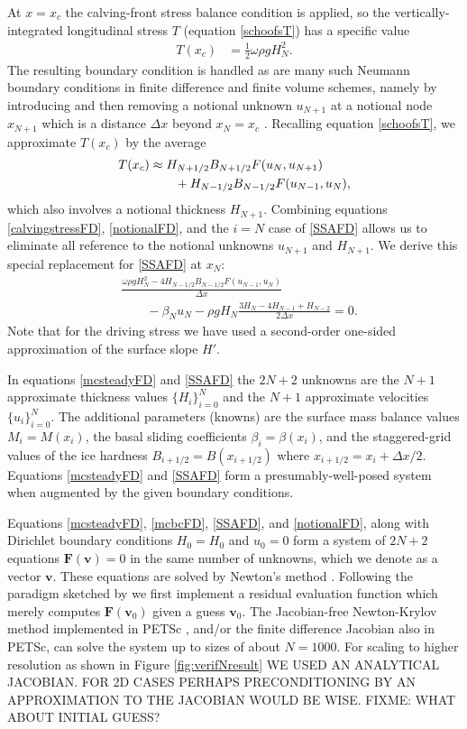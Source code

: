 \documentclass[twocolumn,letterpaper]{igs}
\begin{document}
At $x=x_c$ the calving-front stress balance condition is applied, so the vertically-integrated longitudinal stress $T$ (equation \eqref{schoofsT}) has a specific value
\begin{align}
T(x_c) &= \frac{1}{2} \omega \rho g H_N^2. \label{calvingstressFD}
\end{align}
The resulting boundary condition is handled as are many such Neumann boundary conditions in finite difference and finite volume schemes, namely by introducing and then removing a notional unknown $u_{N+1}$ at a notional node $x_{N+1}$ which is a distance $\Delta x$ beyond $x_N=x_c$ \citep{MortonMayers}.  Recalling equation \eqref{schoofsT}, we approximate $T(x_c)$ by the average
\begin{align}
T(x_c) &\approx H_{N+1/2} B_{N+1/2} F(u_N,u_{N+1}) \notag \\
  &\qquad+ H_{N-1/2} B_{N-1/2} F(u_{N-1},u_{N}),\label{notionalFD}
\end{align}
which also involves a notional thickness $H_{N+1}$.  Combining equations \eqref{calvingstressFD}, \eqref{notionalFD}, and the $i=N$ case of \eqref{SSAFD} allows us to eliminate all reference to the notional unknowns $u_{N+1}$ and $H_{N+1}$.  We derive this special replacement for \eqref{SSAFD} at $x_N$:
\begin{align*}
&\frac{\omega \rho g H_N^2 - 4 H_{N-1/2} B_{N-1/2} F(u_{N-1},u_N)}{\Delta x} \\
&\qquad - \beta_N u_N - \rho g H_N \frac{3 H_N - 4H_{N-1} + H_{N-2}}{2\Delta x} = 0.
\end{align*}
Note that for the driving stress we have used a second-order one-sided approximation of the surface slope $H'$.

In equations \eqref{mcsteadyFD} and \eqref{SSAFD} the $2N+2$ unknowns are the $N+1$ approximate thickness values $\{H_i\}_{i=0}^N$ and the $N+1$ approximate velocities $\{u_i\}_{i=0}^N$.  The additional parameters (knowns) are the surface mass balance values $M_i = M(x_i)$, the basal sliding coefficients $\beta_i = \beta(x_i)$, and the staggered-grid values of the ice hardness $B_{i+1/2} =B(x_{i+1/2})$ where $x_{i+1/2} = x_i + \Delta x/2$.  Equations \eqref{mcsteadyFD} and \eqref{SSAFD} form a presumably-well-posed system when augmented by the given boundary conditions.

Equations \eqref{mcsteadyFD}, \eqref{mcbcFD}, \eqref{SSAFD}, and \eqref{notionalFD}, along with Dirichlet boundary conditions $H_0=H_0$ and $u_0=0$ form a system of $2N+2$ equations $\mathbf{F}(\mathbf{v})=0$ in the same number of unknowns, which we denote as a vector $\mathbf{v}$.  These equations are solved by Newton's method \citep[e.g.][]{Pressetal}.  Following the paradigm sketched by \cite{KnollKeyes2004} we first implement a residual evaluation function which merely computes $\mathbf{F}(\mathbf{v}_0)$ given a guess $\mathbf{v}_0$.  The Jacobian-free Newton-Krylov method implemented in PETSc \citep{KnollKeyes2004,petsc-user-ref}, and/or the finite difference Jacobian also in PETSc, can solve the system up to sizes of about $N=1000$.  For scaling to higher resolution as shown in Figure \ref{fig:verifNresult} WE USED AN ANALYTICAL JACOBIAN.  FOR 2D CASES PERHAPS PRECONDITIONING BY AN APPROXIMATION TO THE JACOBIAN WOULD BE WISE.  FIXME: WHAT ABOUT INITIAL GUESS?
\end{document}
